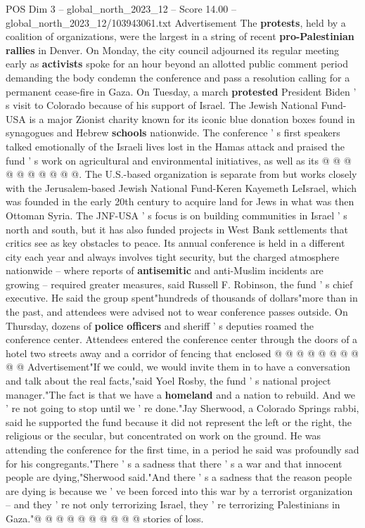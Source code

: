 \begin{textsample}{POS Dim 3 – global\_north\_2023\_12 – Score 14.00 – global\_north\_2023\_12/103943061.txt}
Advertisement The \textbf{protests}, held by a coalition of organizations, were the largest in a string of recent \textbf{pro-Palestinian} \textbf{rallies} in Denver.
On Monday, the city council adjourned its regular meeting early as \textbf{activists} spoke for an hour beyond an allotted public comment period demanding the body condemn the conference and pass a resolution calling for a permanent cease-fire in Gaza.
On Tuesday, a march \textbf{protested} President Biden ' s visit to Colorado because of his support of Israel.
The Jewish National Fund-USA is a major Zionist charity known for its iconic blue donation boxes found in synagogues and Hebrew \textbf{schools} nationwide.
The conference ' s first speakers talked emotionally of the Israeli lives lost in the Hamas attack and praised the fund ' s work on agricultural and environmental initiatives, as well as its @ @ @ @ @ @ @ @ @ @.
The U.S.-based organization is separate from but works closely with the Jerusalem-based Jewish National Fund-Keren Kayemeth LeIsrael, which was founded in the early 20th century to acquire land for Jews in what was then Ottoman Syria.
The JNF-USA ' s focus is on building communities in Israel ' s north and south, but it has also funded projects in West Bank settlements that critics see as key obstacles to peace.
Its annual conference is held in a different city each year and always involves tight security, but the charged atmosphere nationwide -- where reports of \textbf{antisemitic} and anti-Muslim incidents are growing -- required greater measures, said Russell F.
Robinson, the fund ' s chief executive.
He said the group spent"hundreds of thousands of dollars"more than in the past, and attendees were advised not to wear conference passes outside.
On Thursday, dozens of \textbf{police} \textbf{officers} and sheriff ' s deputies roamed the conference center.
Attendees entered the conference center through the doors of a hotel two streets away and a corridor of fencing that enclosed @ @ @ @ @ @ @ @ @ @ Advertisement"If we could, we would invite them in to have a conversation and talk about the real facts,"said Yoel Rosby, the fund ' s national project manager."The fact is that we have a \textbf{homeland} and a nation to rebuild.
And we ' re not going to stop until we ' re done."Jay Sherwood, a Colorado Springs rabbi, said he supported the fund because it did not represent the left or the right, the religious or the secular, but concentrated on work on the ground.
He was attending the conference for the first time, in a period he said was profoundly sad for his congregants."There ' s a sadness that there ' s a war and that innocent people are dying,"Sherwood said."And there ' s a sadness that the reason people are dying is because we ' ve been forced into this war by a terrorist organization -- and they ' re not only terrorizing Israel, they ' re terrorizing Palestinians in Gaza."@ @ @ @ @ @ @ @ @ @ stories of loss.

\end{textsample}
